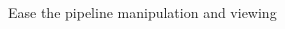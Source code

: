 \documentclass{beamer}
\begin{document}
\begin{frame}{Ease the pipeline manipulation and viewing}
\begin{columns}
\begin{column}{0.5\textwidth}


\end{column}
\end{columns}
\end{frame}
\end{document}
